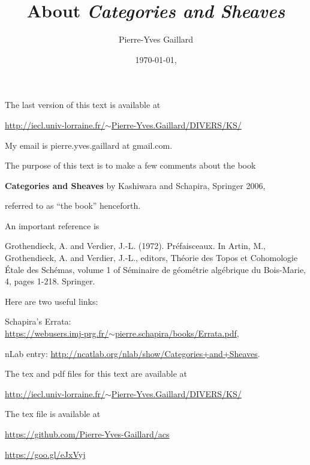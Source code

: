 \documentclass[12pt]{article}
\title{About \em{Categories and Sheaves}}
\author{Pierre-Yves Gaillard}%
\date{\today, \currenttime}
\theoremstyle{remark}
\theoremstyle{definition}
\begin{document}
\maketitle

\nn The last version of this text is available at\medskip

\centerline{\href{http://iecl.univ-lorraine.fr/~Pierre-Yves.Gaillard/DIVERS/KS/}{http://iecl.univ-lorraine.fr/$\sim$Pierre-Yves.Gaillard/DIVERS/KS/}}

My email is pierre.yves.gaillard at gmail.com.

\tableofcontents\newpage

\nn The purpose of this text is to make a few comments about the book 

\textbf{Categories and Sheaves} by Kashiwara and Schapira, Springer 2006, 

\nn referred to as ``the book'' henceforth. 

An important reference is

\nn[GV] Grothendieck, A. and Verdier, J.-L. (1972). Préfaisceaux. In Artin, M., Grothendieck, A. and Verdier, J.-L., editors, Théorie des Topos et Cohomologie Étale des Schémas, volume 1 of Séminaire de géométrie algébrique du Bois-Marie, 4, pages 1-218. Springer. 


Here are two useful links:

\nn Schapira's Errata:\\ \href{https://webusers.imj-prg.fr/~pierre.schapira/books/Errata.pdf}{https://webusers.imj-prg.fr/$\sim$pierre.schapira/books/Errata.pdf}, 

\nn nLab entry: \href{http://ncatlab.org/nlab/show/Categories+and+Sheaves}{http://ncatlab.org/nlab/show/Categories+and+Sheaves}. 

The tex and pdf files for this text are available at
 
\nn\href{http://iecl.univ-lorraine.fr/~Pierre-Yves.Gaillard/DIVERS/KS/}{http://iecl.univ-lorraine.fr/$\sim$Pierre-Yves.Gaillard/DIVERS/KS/}

The tex file is available at

\nn\href{https://github.com/Pierre-Yves-Gaillard/acs}{https://github.com/Pierre-Yves-Gaillard/acs}

\nn\href{https://goo.gl/eJxVyj}{https://goo.gl/eJxVyj}

\end{document}
